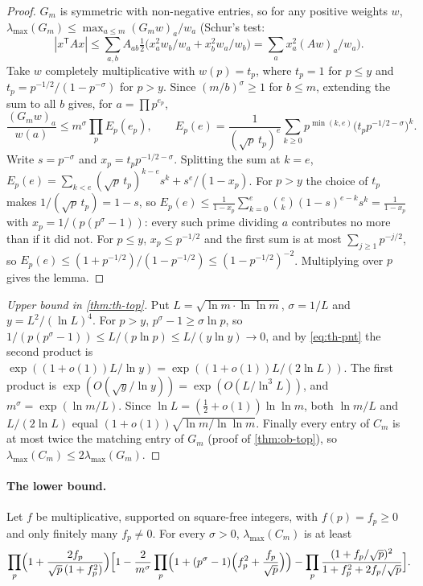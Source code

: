\begin{proof}
$G_m$ is symmetric with non-negative entries, so for any positive weights $w$, $\lambda_{\max}(G_m) \le \max_{a \le m}(G_mw)_a/w_a$ (Schur's test:
\[
  |x^{\mathsf T}Ax| \le \sum_{a,b}A_{ab}\tfrac12\bigl(x_a^2w_b/w_a + x_b^2w_a/w_b\bigr) = \sum_a x_a^2(Aw)_a/w_a\text{).}
\] Take $w$ completely multiplicative with $w(p) = t_p$, where $t_p = 1$ for $p \le y$ and $t_p = p^{-1/2}/(1 - p^{-\sigma})$ for $p > y$. Since $(m/b)^\sigma \ge 1$ for $b \le m$, extending the sum to all $b$ gives, for $a = \prod p^{e_p}$,
\[
  \frac{(G_mw)_a}{w(a)} \le m^\sigma\prod_p E_p(e_p), \qquad E_p(e) = \frac{1}{(\sqrt p\,t_p)^e}\sum_{k \ge 0}p^{\min(k,e)}\bigl(t_pp^{-1/2-\sigma}\bigr)^k.
\]
Write $s = p^{-\sigma}$ and $x_p = t_pp^{-1/2-\sigma}$. Splitting the sum at $k = e$, $E_p(e) = \sum_{k<e}(\sqrt p\,t_p)^{k-e}s^k + s^e/(1 - x_p)$. For $p > y$ the choice of $t_p$ makes $1/(\sqrt p\,t_p) = 1 - s$, so $E_p(e) \le \frac{1}{1-x_p}\sum_{k=0}^{e}\binom{e}{k}(1-s)^{e-k}s^k = \frac{1}{1-x_p}$ with $x_p = 1/(p(p^\sigma-1))$: every such prime dividing $a$ contributes no more than if it did not. For $p \le y$, $x_p \le p^{-1/2}$ and the first sum is at most $\sum_{j\ge1}p^{-j/2}$, so $E_p(e) \le (1 + p^{-1/2})/(1 - p^{-1/2}) \le (1 - p^{-1/2})^{-2}$. Multiplying over $p$ gives the lemma.
\end{proof}

\begin{proof}[Upper bound in \cref{thm:th-top}]
Put $L = \sqrt{\ln m\cdot\ln\ln m}$, $\sigma = 1/L$ and $y = L^2/(\ln L)^4$. For $p > y$, $p^\sigma - 1 \ge \sigma\ln p$, so $1/(p(p^\sigma - 1)) \le L/(p\ln p) \le L/(y\ln y) \to 0$, and by \eqref{eq:th-pnt} the second product is $\exp((1 + o(1))L/\ln y) = \exp((1 + o(1))L/(2\ln L))$. The first product is $\exp(O(\sqrt y/\ln y)) = \exp(O(L/\ln^3L))$, and $m^\sigma = \exp(\ln m/L)$. Since $\ln L = (\tfrac12 + o(1))\ln\ln m$, both $\ln m/L$ and $L/(2\ln L)$ equal $(1 + o(1))\sqrt{\ln m/\ln\ln m}$. Finally every entry of $C_m$ is at most twice the matching entry of $G_m$ (proof of \cref{thm:ob-top}), so $\lambda_{\max}(C_m) \le 2\lambda_{\max}(G_m)$.
\end{proof}

\paragraph{The lower bound.}

\begin{lemma}\label{lem:th-lower}
Let $f$ be multiplicative, supported on square-free integers, with $f(p) = f_p \ge 0$ and only finitely many $f_p \ne 0$. For every $\sigma > 0$, $\lambda_{\max}(C_m)$ is at least
\[
  \prod_p\Bigl(1 + \frac{2f_p}{\sqrt p\,(1 + f_p^2)}\Bigr)\Bigl[1 - \frac{2}{m^\sigma}\prod_p\Bigl(1 + (p^\sigma - 1)\Bigl(f_p^2 + \frac{f_p}{\sqrt p}\Bigr)\Bigr) - \prod_p\frac{(1 + f_p/\sqrt p)^2}{1 + f_p^2 + 2f_p/\sqrt p}\Bigr].
\]
\end{lemma}

